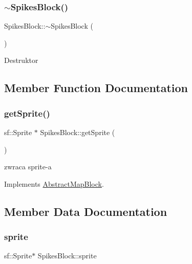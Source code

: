 \subsubsection{\texorpdfstring{$\sim$\+Spikes\+Block()}{~SpikesBlock()}}
{\footnotesize\ttfamily Spikes\+Block\+::$\sim$\+Spikes\+Block (\begin{DoxyParamCaption}{ }\end{DoxyParamCaption})}

Destruktor 

\subsection{Member Function Documentation}
\mbox{\label{class_spikes_block_a01ee14c5a7053180abfc6620fbe1e3cd}} 
\subsubsection{\texorpdfstring{get\+Sprite()}{getSprite()}}
{\footnotesize\ttfamily sf\+::\+Sprite $\ast$ Spikes\+Block\+::get\+Sprite (\begin{DoxyParamCaption}{ }\end{DoxyParamCaption})\hspace{0.3cm}{\ttfamily [virtual]}}

zwraca sprite-\/a 

Implements \hyperlink{class_abstract_map_block_ab5a448a1b6478d10a8814c6d19c4fdb4}{Abstract\+Map\+Block}.



\subsection{Member Data Documentation}
\mbox{\label{class_spikes_block_af553d7cee5570d44b0352a583e348a77}} 
\subsubsection{\texorpdfstring{sprite}{sprite}}
{\footnotesize\ttfamily sf\+::\+Sprite$\ast$ Spikes\+Block\+::sprite\hspace{0.3cm}{\ttfamily [protected]}}

